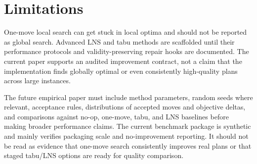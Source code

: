 \section{Limitations}

One-move local search can get stuck in local optima and should not be reported
as global search. Advanced LNS and tabu methods are scaffolded until their
performance protocols and validity-preserving repair hooks are documented.
The current paper supports an audited improvement contract, not a claim that
the implementation finds globally optimal or even consistently high-quality
plans across large instances.

The future empirical paper must include method parameters, random seeds where
relevant, acceptance rules, distributions of accepted moves and objective
deltas, and comparisons against no-op, one-move, tabu, and LNS baselines before
making broader performance claims.
The current benchmark package is synthetic and mainly verifies packaging scale
and no-improvement reporting. It should not be read as evidence that one-move
search consistently improves real plans or that staged tabu/LNS options are
ready for quality comparison.
